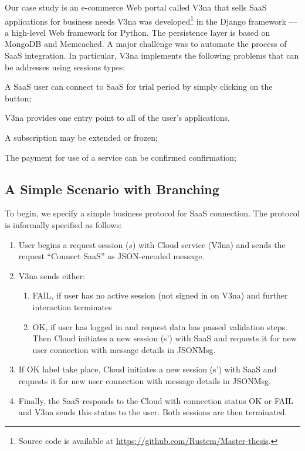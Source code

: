\documentclass{llncs}
\begin{document}
Our case study is an e-commerce Web portal called V3na that sells SaaS applications for business needs
V3na was developed\footnote{Source code is available at \url{https://github.com/Rustem/Master-thesis}.}
in the Django framework --- a high-level Web framework for Python. %
The persistence layer is based on MongoDB and Memcached.
A major challenge was to automate the process of SaaS integration.
In particular, V3na implements the following problems that can be addresses using sessions types:
%
\begin{compactitem}
\item  A SaaS user can connect to SaaS for trial period by simply clicking on the button;

\item  V3na provides one entry point to all of the user's applications.

\item  A subscription may be extended or frozen;

\item  The payment for use of a service can be confirmed confirmation;
\end{compactitem}

\subsection{A Simple Scenario with Branching}
To begin, we specify a simple business protocol for SaaS connection. The protocol is informally specified as follows:
\begin{enumerate}
\item  User begins a request session ($s$) with Cloud service (V3na) and sends the request ``Connect SaaS'' as JSON-encoded message.
\item  V3na sends either:
\begin{enumerate}
\item  FAIL, if user has no active session (not signed in on V3na) and further interaction terminates 

\item  OK, if user has logged in and request data has passed validation steps. Then Cloud initiates a new session (s') with SaaS and requests it for new user connection with message details in JSONMsg.
\end{enumerate}
\item  If OK label take place, Cloud initiates a new session (s') with SaaS and requests it for new user connection with message details in JSONMsg.
\item Finally, the SaaS responds to the Cloud with connection status OK or FAIL and V3na sends this status to the user. Both sessions are then terminated.
\end{enumerate}
\end{document}
